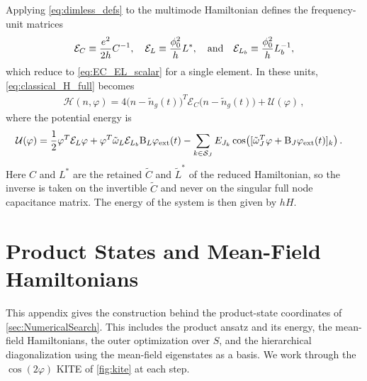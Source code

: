 Applying \cref{eq:dimless_defs} to the multimode Hamiltonian defines the frequency-unit matrices
\begin{align}
    \mathcal{E}_C \equiv \frac{e^2}{2h}C^{-1}, \quad
    \mathcal{E}_L \equiv \frac{\phi_0^2}{h}L^*, \quad {\rm and} \quad
    \mathcal{E}_{L_b} \equiv \frac{\phi_0^2}{h}L_b^{-1},
    \label{eq:EC_EL_matrix}
\end{align}
which reduce to \cref{eq:EC_EL_scalar} for a single element.
In these units, \cref{eq:classical_H_full} becomes
\begin{align}
    \mathcal{H}(n,\varphi) = 4\bigl(n-\tilde n_g(t)\bigr)^T\mathcal{E}_C\bigl(n-\tilde n_g(t)\bigr) + \mathcal{U}(\varphi) \, ,
    \label{eq:full_H_dimless}
\end{align}
where the potential energy is
\begin{align*}
    \mathcal{U}(\varphi) &= \frac{1}{2}\varphi^T\mathcal{E}_L\varphi + \varphi^T\tilde\omega_L\mathcal{E}_{L_b}\mathrm{B}_L\varphi_{\rm ext}(t) - \sum_{k\in\mathcal{S}_J}E_{J_k}\cos\bigl([\tilde\omega_J^T\varphi+\mathrm{B}_J\varphi_{\rm ext}(t)]_k\bigr) \, .
\end{align*}
Here $C$ and $L^*$ are the retained $\tilde{C}$ and $\tilde{L}^*$ of the reduced Hamiltonian, so the inverse is taken on the invertible $\tilde{C}$ and never on the singular full node capacitance matrix.
The energy of the system is then given by $h H$.


\section{Product States and Mean-Field Hamiltonians}\label{apx:meanfield}
This appendix gives the construction behind the product-state coordinates of \cref{sec:NumericalSearch}.
This includes the product ansatz and its energy, the mean-field Hamiltonians, the outer optimization over $S$, and the hierarchical diagonalization using the mean-field eigenstates as a basis.
We work through the $\cos(2\varphi)$ KITE of \cref{fig:kite} at each step.

